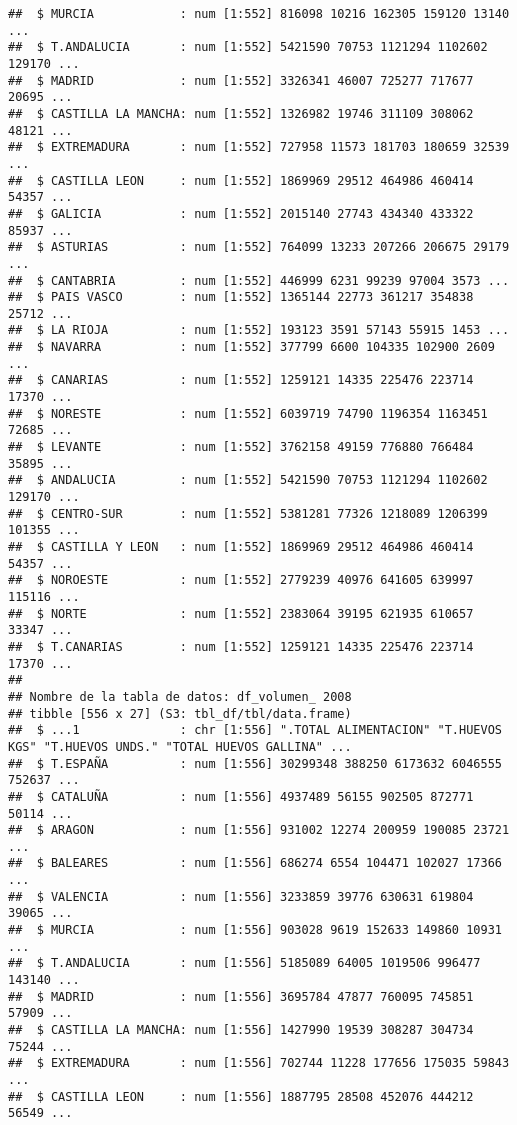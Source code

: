 \documentclass[
]{article}
\begin{document}
\begin{verbatim}
##  $ MURCIA            : num [1:552] 816098 10216 162305 159120 13140 ...
##  $ T.ANDALUCIA       : num [1:552] 5421590 70753 1121294 1102602 129170 ...
##  $ MADRID            : num [1:552] 3326341 46007 725277 717677 20695 ...
##  $ CASTILLA LA MANCHA: num [1:552] 1326982 19746 311109 308062 48121 ...
##  $ EXTREMADURA       : num [1:552] 727958 11573 181703 180659 32539 ...
##  $ CASTILLA LEON     : num [1:552] 1869969 29512 464986 460414 54357 ...
##  $ GALICIA           : num [1:552] 2015140 27743 434340 433322 85937 ...
##  $ ASTURIAS          : num [1:552] 764099 13233 207266 206675 29179 ...
##  $ CANTABRIA         : num [1:552] 446999 6231 99239 97004 3573 ...
##  $ PAIS VASCO        : num [1:552] 1365144 22773 361217 354838 25712 ...
##  $ LA RIOJA          : num [1:552] 193123 3591 57143 55915 1453 ...
##  $ NAVARRA           : num [1:552] 377799 6600 104335 102900 2609 ...
##  $ CANARIAS          : num [1:552] 1259121 14335 225476 223714 17370 ...
##  $ NORESTE           : num [1:552] 6039719 74790 1196354 1163451 72685 ...
##  $ LEVANTE           : num [1:552] 3762158 49159 776880 766484 35895 ...
##  $ ANDALUCIA         : num [1:552] 5421590 70753 1121294 1102602 129170 ...
##  $ CENTRO-SUR        : num [1:552] 5381281 77326 1218089 1206399 101355 ...
##  $ CASTILLA Y LEON   : num [1:552] 1869969 29512 464986 460414 54357 ...
##  $ NOROESTE          : num [1:552] 2779239 40976 641605 639997 115116 ...
##  $ NORTE             : num [1:552] 2383064 39195 621935 610657 33347 ...
##  $ T.CANARIAS        : num [1:552] 1259121 14335 225476 223714 17370 ...
##  
## Nombre de la tabla de datos: df_volumen_ 2008 
## tibble [556 x 27] (S3: tbl_df/tbl/data.frame)
##  $ ...1              : chr [1:556] ".TOTAL ALIMENTACION" "T.HUEVOS KGS" "T.HUEVOS UNDS." "TOTAL HUEVOS GALLINA" ...
##  $ T.ESPAÑA          : num [1:556] 30299348 388250 6173632 6046555 752637 ...
##  $ CATALUÑA          : num [1:556] 4937489 56155 902505 872771 50114 ...
##  $ ARAGON            : num [1:556] 931002 12274 200959 190085 23721 ...
##  $ BALEARES          : num [1:556] 686274 6554 104471 102027 17366 ...
##  $ VALENCIA          : num [1:556] 3233859 39776 630631 619804 39065 ...
##  $ MURCIA            : num [1:556] 903028 9619 152633 149860 10931 ...
##  $ T.ANDALUCIA       : num [1:556] 5185089 64005 1019506 996477 143140 ...
##  $ MADRID            : num [1:556] 3695784 47877 760095 745851 57909 ...
##  $ CASTILLA LA MANCHA: num [1:556] 1427990 19539 308287 304734 75244 ...
##  $ EXTREMADURA       : num [1:556] 702744 11228 177656 175035 59843 ...
##  $ CASTILLA LEON     : num [1:556] 1887795 28508 452076 444212 56549 ...

\end{verbatim}
\end{document}
